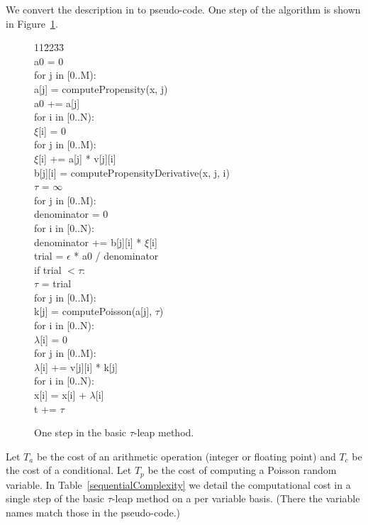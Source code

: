 \documentclass[letterpaper]{article}
\begin{document}
We convert the description in \cite{gillespie} to  
pseudo-code.  One step of the algorithm is shown in 
Figure~\ref{sequential}.

\begin{figure}[h]
\begin{tabbing}
11\=22\=33\=\kill\\
a0 = 0\\
for j in [0..M):\\
\>a[j] = computePropensity(x, j)\\
\>a0 += a[j]\\
for i in [0..N):\\
\>$\xi$[i] = 0\\
\>for j in [0..M):\\
\>\>$\xi$[i] += a[j] * v[j][i]\\
\>\>b[j][i] = computePropensityDerivative(x, j, i)\\
$\tau$ = $\infty$\\
for j in [0..M):\\
\>denominator = 0\\
\>for i in [0..N):\\
\>\>denominator += b[j][i] * $\xi$[i]\\
\>trial = $\epsilon$ * a0 / denominator\\
\>if trial $< \tau$:\\
\>\>$\tau$ = trial\\
for j in [0..M):\\
\>k[j] = computePoisson(a[j], $\tau$)\\
for i in [0..N):\\
\>$\lambda$[i] = 0\\
\>for j in [0..M):\\
\>\>$\lambda$[i] += v[j][i] * k[j]\\
for i in [0..N):\\
\>x[i] = x[i] + $\lambda$[i]\\
t += $\tau$
\end{tabbing}
\caption{One step in the basic $\tau$-leap method.}
\label{sequential}
\end{figure}



Let $T_a$ be the cost of an arithmetic operation (integer or floating point) 
and $T_c$ be the cost of a conditional.
Let $T_p$ be the cost of computing a Poisson random variable.  
In Table~\ref{sequentialComplexity} we 
detail the computational cost in a single step of the basic $\tau$-leap
method on a per variable basis.  (There the variable names match those in
the pseudo-code.)
\end{document}
